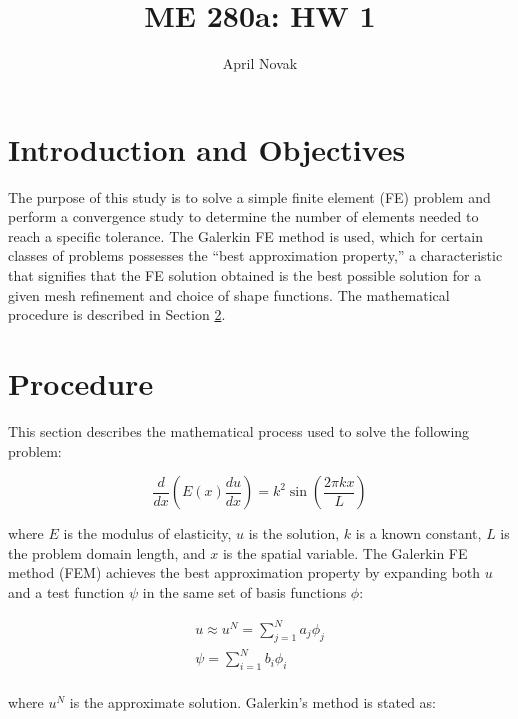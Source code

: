 \documentclass[10pt]{article}
\begin{document}
\title{ME 280a: HW 1}
\author{April Novak}

\maketitle

\section{Introduction and Objectives}

The purpose of this study is to solve a simple finite element (FE) problem and perform a convergence study to determine the number of elements needed to reach a specific tolerance. The Galerkin FE method is used, which for certain classes of problems possesses the ``best approximation property,'' a characteristic that signifies that the FE solution obtained is the best possible solution for a given mesh refinement and choice of shape functions. The mathematical procedure is described in Section \ref{sec:Procedure}.

\section{Procedure}
\label{sec:Procedure}

This section describes the mathematical process used to solve the following problem:

\begin{equation}
\label{eq:Problem}
\frac{d}{dx}\left(E(x)\frac{du}{dx}\right)=k^2\sin{\left(\frac{2\pi kx}{L}\right)}
\end{equation}

where \(E\) is the modulus of elasticity, \(u\) is the solution, \(k\) is a known constant, \(L\) is the problem domain length, and \(x\) is the spatial variable. The Galerkin FE method (FEM) achieves the best approximation property by expanding both \(u\) and a test function \(\psi\) in the same set of basis functions \(\phi\):

\begin{equation}
\label{eq:approx}
\begin{aligned}
u\approx u^N=\sum_{j=1}^{N}a_j\phi_j\\
\psi=\sum_{i=1}^{N}b_i\phi_i\\
\end{aligned}
\end{equation}

where \(u^N\) is the approximate solution. Galerkin's method is stated as:
\end{document}
